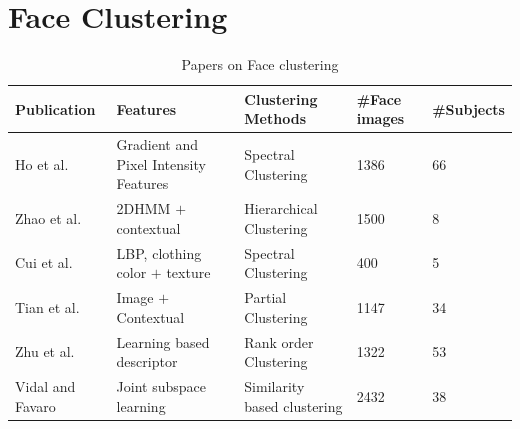 \documentclass[a4paper,12pt, twoside]{NITKReport}
\begin{document}
\section{Face Clustering}
\begin{table}
  \centering
\begin{tabular}{ |p{3cm}|p{3cm}|p{2.5cm}|p{2cm}|p{2cm}|}
 \hline
 Publication & Features & Clustering Methods & \#Face images & \#Subjects\\
 \hline
 Ho et al.\cite{ho2003clustering} & Gradient and Pixel Intensity Features& Spectral Clustering & 1386 & 66\\
 \hline
 Zhao et al.\cite{zhao2006automatic} & 2DHMM $+$ contextual & Hierarchical Clustering & 1500 & 8\\
  \hline
 Cui et al.\cite{cui2007easyalbum} & LBP, clothing color $+$ texture & Spectral Clustering & 400 & 5\\
  \hline
 Tian et al.\cite{tian2007face} & Image $+$ Contextual & Partial Clustering & 1147 & 34\\
  \hline
 Zhu et al.\cite{zhu2011rank} & Learning based descriptor & Rank order Clustering & 1322 & 53\\
  \hline
  Vidal and Favaro \cite{li2015structured} \cite{zhang2014jointly} & Joint subspace learning & Similarity based clustering & 2432 & 38\\
 \hline
\end{tabular}
\caption{Papers on Face clustering}\label{table:papers}
\end{table}
\end{document}
